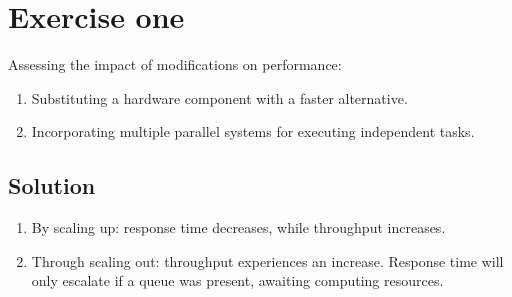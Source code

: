 \section{Exercise one}

Assessing the impact of modifications on performance:
\begin{enumerate}
    \item Substituting a hardware component with a faster alternative.
    \item Incorporating multiple parallel systems for executing independent tasks.
\end{enumerate}

\subsection{Solution}
\begin{enumerate}
    \item By scaling up: response time decreases, while throughput increases.
    \item Through scaling out: throughput experiences an increase.
        Response time will only escalate if a queue was present, awaiting computing resources.
\end{enumerate}